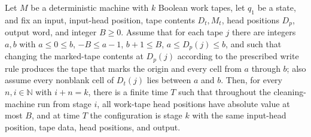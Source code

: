 \begin{lemma}
\label{Complexity.LogProg.stages_run}
\leanok
{}
Let $M$ be a deterministic machine with $k$ Boolean work tapes, let $q_1$ be a state,
and fix an input, input-head position, tape contents $D_t,M_t$, head positions $D_p$,
output word, and integer $B\ge 0$. Assume that for each tape $j$ there are integers
$a,b$ with $a\le0\le b$, $-B\le a-1$, $b+1\le B$, $a\le D_p(j)\le b$, and such that
changing the marked-tape contents at $D_p(j)$ according to the prescribed write rule
produces the tape that marks the origin and every cell from $a$ through $b$; also assume
every nonblank cell of $D_t(j)$ lies between $a$ and $b$. Then, for every $n,i\in\mathbb
N$ with $i+n=k$, there is a finite time $T$ such that throughout the cleaning-machine
run from stage $i$, all work-tape head positions have absolute value at most $B$, and at
time $T$ the configuration is stage $k$ with the same input-head position, tape data,
head positions, and output.
\end{lemma}

